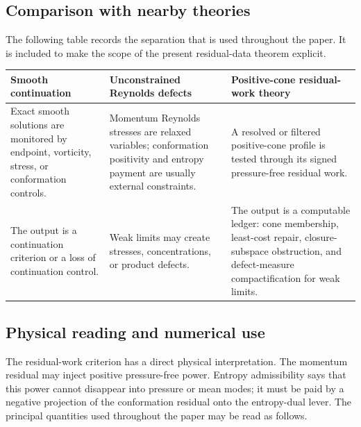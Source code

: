 \documentclass[11pt]{article}
\numberwithin{equation}{section}
\begin{document}
\subsection*{Comparison with nearby theories}
The following table records the separation that is used throughout the paper.
It is included to make the scope of the present residual-data theorem explicit.

\begin{center}
\small
\renewcommand{\arraystretch}{1.12}
\begin{tabularx}{\textwidth}{YYY}
\hline
\textbf{Smooth continuation} & \textbf{Unconstrained Reynolds defects} &
\textbf{Positive-cone residual-work theory} \\
\hline
Exact smooth solutions are monitored by endpoint, vorticity, stress, or
conformation controls. & Momentum Reynolds stresses are relaxed variables;
conformation positivity and entropy payment are usually external constraints. &
A resolved or filtered positive-cone profile is tested through its signed
pressure-free residual work. \\
\hline
The output is a continuation criterion or a loss of continuation control. &
Weak limits may create stresses, concentrations, or product defects. & The
output is a computable ledger: cone membership, least-cost repair,
closure-subspace obstruction, and defect-measure compactification for weak
limits. \\
\hline
\end{tabularx}

\end{center}

\subsection*{Physical reading and numerical use}
The residual-work criterion has a direct physical interpretation.  The
momentum residual may inject positive pressure-free power.  Entropy
admissibility says that this power cannot disappear into pressure or mean
modes; it must be paid by a negative projection of the conformation residual
onto the entropy-dual lever.  The principal quantities used throughout the
paper may be read as follows.
\end{document}
